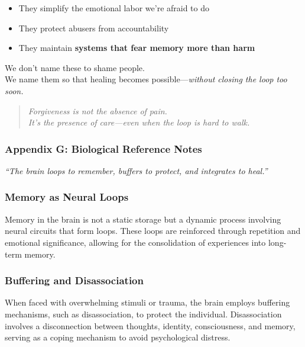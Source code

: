 \begin{itemize}
\item
  They simplify the emotional labor we're afraid to do
\item
  They protect abusers from accountability
\item
  They maintain \textbf{systems that fear memory more than harm\\
  }
\end{itemize}

We don't name these to shame people.\\
We name them so that healing becomes possible---\emph{without closing
the loop too soon.}

\begin{quote}
\emph{Forgiveness is not the absence of pain.\\
It's the presence of care---even when the loop is hard to walk.}
\end{quote}

\subsubsection{\texorpdfstring{\textbf{Appendix G: Biological Reference
Notes}}{Appendix G: Biological Reference Notes}}\label{appendix-g-biological-reference-notes}

\emph{``The brain loops to remember, buffers to protect, and integrates
to heal.''}

\subsubsection{\texorpdfstring{\textbf{Memory as Neural
Loops}}{Memory as Neural Loops}}\label{memory-as-neural-loops}

Memory in the brain is not a static storage but a dynamic process
involving neural circuits that form loops. These loops are reinforced
through repetition and emotional significance, allowing for the
consolidation of experiences into long-term memory.

\subsubsection{\texorpdfstring{\textbf{Buffering and
Disassociation}}{Buffering and Disassociation}}\label{buffering-and-disassociation}

When faced with overwhelming stimuli or trauma, the brain employs
buffering mechanisms, such as disassociation, to protect the individual.
Disassociation involves a disconnection between thoughts, identity,
consciousness, and memory, serving as a coping mechanism to avoid
psychological distress.

